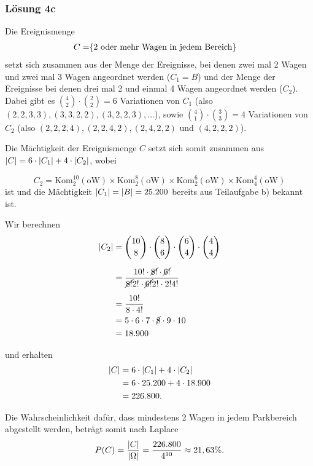 \documentclass[main.tex]{subfiles}
\begin{document}
\subsubsection{Lösung 4c}
Die Ereignismenge $$\begin{aligned}
    C = & \set*{\text{2 oder mehr Wagen in jedem Bereich}}
\end{aligned}$$
setzt sich zusammen aus der Menge der Ereignisse, bei denen zwei mal 2 Wagen und zwei mal 3 Wagen angeordnet werden ($C_1 = B$) und der Menge der Ereignisse bei denen drei mal 2 und einmal 4 Wagen angeordnet werden ($C_2$).
Dabei gibt es $\binom{4}{2} \cdot \binom{2}{2} = 6$ Variationen von $C_1$ (also $(2,2,3,3), (3,3,2,2), (3,2,2,3), \ldots$), sowie $\binom{4}{1} \cdot \binom{3}{3} = 4$ Variationen von $C_2$ (also $(2,2,2,4), (2,2,4,2), (2,4,2,2)$ und $(4,2,2,2)$).

Die Mächtigkeit der Ereignismenge $C$ setzt sich somit zusammen aus $\abs*{C} = 6\cdot \abs*{C_1} + 4\cdot \abs*{C_2}$, wobei

$$
    C_2 = \text{Kom}^{10}_{2}(\text{oW})
    \times \text{Kom}^{8}_{2}(\text{oW})
    \times \text{Kom}^{6}_{2}(\text{oW})
    \times \text{Kom}^{4}_{4}(\text{oW})
$$
ist und die Mächtigkeit $\abs*{C_1} = \abs*{B} = 25.200$ bereits aus Teilaufgabe b) bekannt ist.

Wir berechnen $$\begin{aligned}
    \abs*{C_2} &= \binom{10}{8}\cdot \binom{8}{6}\cdot \binom{6}{4}\cdot \binom{4}{4} \\[2mm]
    &= \frac{10!\cdot \cancel{8!}\cdot \cancel{6!}}{\cancel{8!}2!\cdot \cancel{6!}2!\cdot 2!4!} \\[2mm]
    &= \frac{10!}{8\cdot 4!} \\
    &= 5\cdot 6\cdot 7\cdot \cancel{8}\cdot 9\cdot 10 \\
    &= 18.900
\end{aligned}$$

und erhalten
$$\begin{aligned}
    \abs*{C} &= 6\cdot\abs*{C_1} + 4\cdot\abs*{C_2} \\
             &= 6\cdot 25.200 + 4\cdot 18.900 \\
             &= 226.800.
\end{aligned}$$


Die Wahrscheinlichkeit dafür, dass mindestens 2 Wagen in jedem Parkbereich abgestellt werden, beträgt somit nach Laplace$$
    P(C) = \frac{\abs*{C}}{\abs*{\Omega}} = \frac{226.800}{4^{10}} \approx 21,63\%.
$$

%
\end{document}
